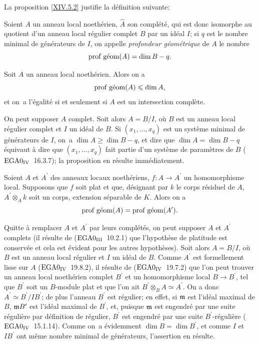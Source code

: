La proposition \ref{XIV.5.2} justifie la d\'efinition suivante:

\begin{definition} \label{XIV.5.3}
Soient $A$ un anneau local noeth\'erien, $\widehat{A}$ son compl\'et\'e, qui est donc isomorphe au quotient d'un anneau local r\'egulier complet $B$ par un id\'eal $I$; si $q$ est le nombre minimal de g\'en\'erateurs de $I$, on appelle \emph{profondeur géométrique} de $A$ le nombre
$$
\operatorname{prof\;g\acute{e}om}(A)=\dim B-q.
$$
\end{definition}

\begin{proposition} \label{XIV.5.4} Soit $A$ un anneau local noeth\'erien. Alors on a
$$
\operatorname{prof\;g\acute{e}om}(A)\leqslant\dim A,
$$
et on~a l'\'egalit\'e si et seulement si $A$ est un intersection compl\`ete.
\end{proposition}

On peut supposer $A$ complet. Soit alors $A=B/I$, o\`u $B$ est un anneau local r\'egulier complet et $I$ un id\'eal de $B$. Si $(x_{1},\dots, x_{q})$ est un syst\`eme minimal de g\'en\'erateurs de $I$, on~a $\dim A\geq\dim B-q$, et dire que $\dim A=\dim B-q$ \'equivaut \`a dire que $(x_{1},\dots, x_{q})$ fait partie d'un syst\`eme de param\`etres de $B$ ($\textup{EGA}\space 0_{\textup{IV}}$~16.3.7); la proposition en r\'esulte imm\'ediatement.

\begin{proposition} \label{XIV.5.5} Soient $A$ et $A^{\prime}$ des anneaux locaux noeth\'eriens, $f\colon A\to A^{\prime}$ un homomorphisme local. Supposons que $f$ soit plat et que, d\'esignant par $k$ le corps r\'esiduel de $A$, $A^{\prime}\otimes_{A}k$ soit un corps, extension s\'eparable de $K$. Alors on a
$$
\operatorname{prof\;g\acute{e}om}(A)=\operatorname{prof\;g\acute{e}om}(A^{\prime}).
$$
\end{proposition}

Quitte \`a remplacer $A$ et $A^{\prime}$ par leurs compl\'et\'es, on peut supposer $A$ et $A^{\prime}$ complets (il r\'esulte de ($\textup{EGA}\space 0_{\textup{III}}$~10.2.1) que l'hypoth\`ese de platitude est conserv\'ee et cela est \'evident pour les autres hypoth\`eses). Soit alors $A=B/I$, o\`u $B$ est un anneau local r\'egulier et $I$ un id\'eal de $B$. Comme $A^{\prime}$ est formellement lisse sur $A$ ($\textup{EGA}\space 0_{\textup{IV}}$~19.8.2), il r\'esulte de ($\textup{EGA}\space 0_{\textup{IV}}$~19.7.2) que l'on peut trouver un anneau local noeth\'erien complet $B^{\prime}$ et un homomorphisme local $B\to B^{\prime}$, tel que $B^{\prime}$ soit un $B$-module plat et que l'on ait $B^{\prime}\otimes_{B}A\simeq A^{\prime}$. On a donc $A^{\prime}\simeq B^{\prime}/IB^{\prime}$; de plus l'anneau $B^{\prime}$ est r\'egulier; en effet, si $\mathfrak{m}$ est l'id\'eal maximal de $B$, $\mathfrak{m} B^{\prime}$ est l'id\'eal maximal de $B^{\prime}$, et, puisque $\mathfrak{m}$ est engendr\'e par une suite r\'eguli\`ere par d\'efinition de \og r\'egulier\fg, $B^{\prime}$ est engendr\'e par une suite $B^{\prime}$-r\'eguli\`ere ($\textup{EGA}\space 0_{\textup{IV}}$~15.1.14). Comme on~a \'evidemment $\dim B=\dim B^{\prime}$, et comme $I$ et $IB^{\prime}$ ont m\^eme nombre minimal de g\'en\'erateurs, l'assertion en r\'esulte.

